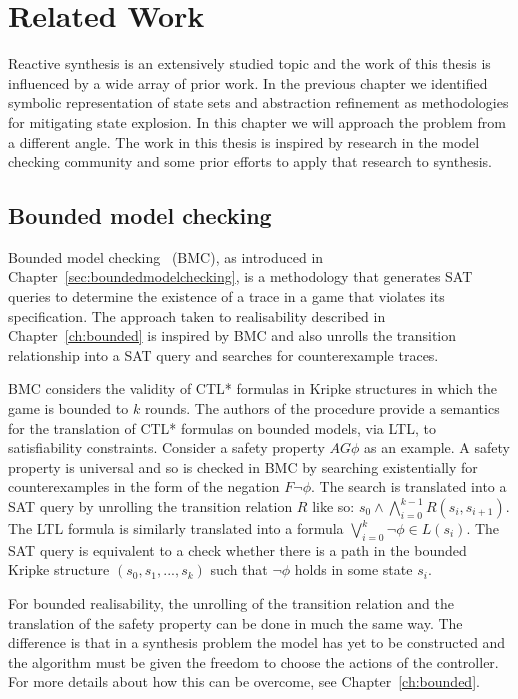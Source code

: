 \chapter{Related Work}
\label{ch:relatedwork}

Reactive synthesis is an extensively studied topic and the work of this thesis is influenced by a wide array of prior work. In the previous chapter we identified symbolic representation of state sets and abstraction refinement as methodologies for mitigating state explosion. In this chapter we will approach the problem from a different angle. The work in this thesis is inspired by research in the model checking community and some prior efforts to apply that research to synthesis.

\section{Bounded model checking}

Bounded model checking~\cite{Biere99} (BMC), as introduced in Chapter~\ref{sec:boundedmodelchecking}, is a methodology that generates SAT queries to determine the existence of a trace in a game that violates its specification. The approach taken to realisability described in Chapter~\ref{ch:bounded} is inspired by BMC and also unrolls the transition relationship into a SAT query and searches for counterexample traces. 

BMC considers the validity of CTL* formulas in Kripke structures in which the game is bounded to $k$ rounds. The authors of the procedure provide a semantics for the translation of CTL* formulas on bounded models, via LTL, to satisfiability constraints. Consider a safety property $AG \phi$ as an example. A safety property is universal and so is checked in BMC by searching existentially for counterexamples in the form of the negation $F \lnot \phi$. The search is translated into a SAT query by unrolling the transition relation $R$ like so: $s_0 \land \bigwedge_{i=0}^{k-1} R(s_i, s_{i+1})$. The LTL formula is similarly translated into a formula $\bigvee_{i=0}^{k} \lnot \phi \in L(s_i)$. The SAT query is equivalent to a check whether there is a path in the bounded Kripke structure $(s_0, s_1, ..., s_k)$ such that $\lnot \phi$ holds in some state $s_i$.

For bounded realisability, the unrolling of the transition relation and the translation of the safety property can be done in much the same way. The difference is that in a synthesis problem the model has yet to be constructed and the algorithm must be given the freedom to choose the actions of the controller. For more details about how this can be overcome, see Chapter~\ref{ch:bounded}.

